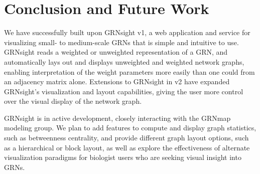 \documentclass[sigconf,review]{acmart}
\begin{document}
\section{Conclusion and Future Work}
We have successfully built upon GRNsight v1, a web application and service for visualizing small- to medium-scale GRNs that is simple and intuitive to use. GRNsight reads a weighted or unweighted representation of a GRN, and automatically lays out and displays unweighted and weighted network graphs, enabling interpretation of the weight parameters more easily than one could from an adjacency matrix alone. Extensions to GRNsight in v2 have expanded GRNsight's visualization and layout capabilities, giving the user more control over the visual display of the network graph.

GRNsight is in active development, closely interacting with the GRNmap modeling group. We plan to add features to compute and display graph statistics, such as betweenness centrality, and provide different graph layout options, such as a hierarchical or block layout, as well as explore the effectiveness of alternate visualization paradigms for biologist users who are seeking visual insight into GRNs.


 
\end{document}
